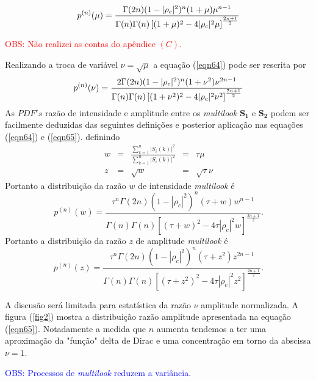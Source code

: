 \begin{equation}\label{eqn64}
	p^{(n)}(\mu)=\frac{\Gamma(2n)(1-|\rho_c|^2)^{n}(1+\mu)\mu^{n-1}}{\Gamma(n)\Gamma(n)\left[(1+\mu)^2-4|\rho_c|^2\mu \right]^{\frac{2n+1}{2}}}\\
\end{equation}

\textcolor{red}{OBS: Não realizei as contas do apêndice $(C)$.}

Realizando a troca de variável $\nu=\sqrt{\mu}$ a equação (\ref{eqn64}) pode ser rescrita por
\begin{equation}\label{eqn65}
	p^{(n)}(\nu)=\frac{2\Gamma(2n)(1-|\rho_c|^2)^{n}(1+\nu^2)\nu^{2n-1}}{\Gamma(n)\Gamma(n)\left[(1+\nu^2)^2-4|\rho_c|^2\nu^2 \right]^{\frac{2n+1}{2}}}\\
\end{equation}
As $PDF's$ razão de intensidade e amplitude entre os {\it multilook} $\mathbf{S_1}$ e $\mathbf{S_2}$ podem ser facilmente deduzidas das seguintes definições e posterior aplicação nas equações (\ref{eqn64}) e (\ref{eqn65}). definindo 
\begin{equation}\label{eqn66}
\begin{array}{ccccc}
	w&=&\frac{\sum_{k=1}^{n}|S_i(k)|^2}{\sum_{k=1}^{n}|S_i(k)|^2}&=&\tau\mu\\
	z&=&\sqrt{w}&=&\sqrt{\tau}\nu
\end{array}
\end{equation}
Portanto a distribuição da razão $w$ de intensidade {\it multilook} é
\begin{equation}\label{eqn67}
	p^{(n)}(w)=\frac{\tau^{n}\Gamma(2n)(1-|\rho_c|^2)^{n}(\tau+w)w^{n-1}}{\Gamma(n)\Gamma(n)\left[(\tau+w)^2-4\tau|\rho_c|^2w \right]^{\frac{2n+1}{2}}}.
\end{equation}
Portanto a distribuição da razão $z$ de amplitude {\it multilook} é
\begin{equation}\label{eqn68}
	p^{(n)}(z)=\frac{\tau^{n}\Gamma(2n)(1-|\rho_c|^2)^{n}(\tau+z^2)z^{2n-1}}{\Gamma(n)\Gamma(n)\left[(\tau+z^2)^2-4\tau|\rho_c|^2z^2 \right]^{\frac{2n+1}{2}}}.
\end{equation}

A discusão será limitada para estatística da razão $\nu$ amplitude normalizada. A figura (\ref{fig2}) mostra a distribuição razão amplitude apresentada na equação  (\ref{eqn65}). Notadamente a medida que $n$ aumenta tendemos a ter uma aproximação da "função" delta de Dirac e uma concentração em torno da abscissa $\nu=1$.

\textcolor{blue}{OBS: Processos de {\it multilook} reduzem a variância.}


